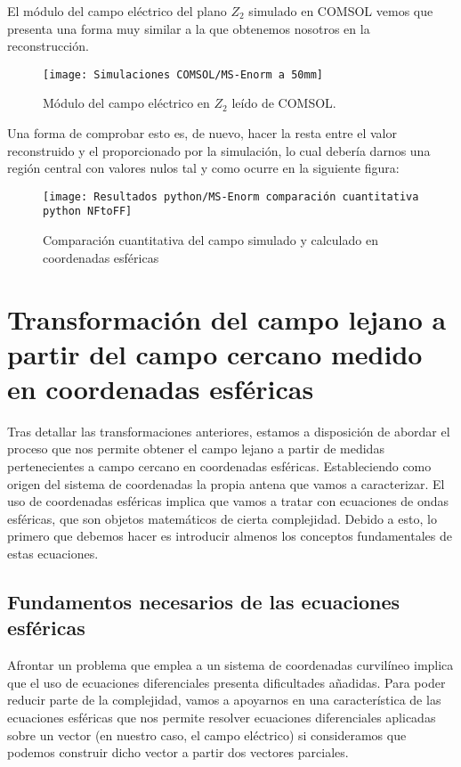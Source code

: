 \newpage

El módulo del campo eléctrico del plano $Z_2$ simulado en COMSOL vemos que presenta una forma muy similar a la que obtenemos nosotros en la reconstrucción.

\begin{figure}[h]
  \centering
    \texttt{[image: Simulaciones COMSOL/MS-Enorm a 50mm]}
    \caption{Módulo del campo eléctrico en $Z_2$ leído de COMSOL.}
    \label{MS-Enorm a 50mm}
\end{figure}

Una forma de comprobar esto es, de nuevo, hacer la resta entre el valor reconstruido y el proporcionado por la simulación, lo cual debería darnos una región central con valores nulos tal y como ocurre en la siguiente figura:

\begin{figure}[h]
  \centering
    \texttt{[image: Resultados python/MS-Enorm comparación cuantitativa python NFtoFF]}
    \caption{Comparación cuantitativa del campo simulado y calculado en coordenadas esféricas}
    \label{Comparación cuantitativa del campo simulado y calculado en coordenadas esféricas}
\end{figure}

\newpage

\section{Transformación del campo lejano a partir del campo cercano medido
en coordenadas esféricas}

Tras detallar las transformaciones anteriores, estamos a disposición de abordar el proceso que nos permite obtener el campo lejano a partir de medidas pertenecientes a campo cercano en coordenadas esféricas. Estableciendo como origen del sistema de coordenadas la propia antena que vamos a caracterizar. El uso de coordenadas esféricas implica que vamos a tratar con ecuaciones de ondas esféricas, que son objetos matemáticos de cierta complejidad. Debido a esto, lo primero que debemos hacer es introducir almenos los conceptos fundamentales de estas ecuaciones.

\subsection{Fundamentos necesarios de las ecuaciones esféricas}

Afrontar un problema que emplea a un sistema de coordenadas curvilíneo implica que el uso de ecuaciones diferenciales presenta dificultades añadidas. Para poder reducir parte de la complejidad, vamos a apoyarnos en una característica de las ecuaciones esféricas que nos permite resolver ecuaciones diferenciales aplicadas sobre un vector (en nuestro caso, el campo eléctrico) si consideramos que podemos construir dicho vector a partir dos vectores parciales.\\

